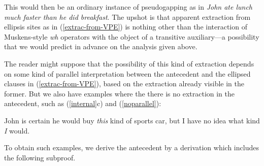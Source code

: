 \documentclass[output=paper,colorlinks,citecolor=brown]{langscibook}
\begin{document}
\begin{exe}
 \ex\label{other}
\end{exe}
This would then be an ordinary instance of pseudogapping as in \textit{John
ate lunch much faster than he did breakfast}. The upshot is that
apparent extraction from ellipsis sites as in (\ref{extrac-from-VPE}) is nothing other than
the interaction of Muskens-style \textit{wh} operators with the object of a
transitive auxiliary---a possibility that we would predict in advance
on the analysis given above.

The reader might suppose that the possibility of this kind of
extraction depends on some kind of parallel interpretation between the
antecedent and the ellipsed clauses in (\ref{extrac-from-VPE}), based on the
extraction already visible in the former. But we also have examples
where the there is no extraction in the antecedent, such as (\ref{internal}c) and (\ref{noparallel}):

\begin{exe}
 \ex\label{noparallel}
  John is certain he would buy \textsl{this} kind of sports car, but I have no
  idea what kind \textsl{I} would.
\end{exe}
To obtain such examples, we derive the antecedent by a derivation
which includes the following subproof.
\end{document}
